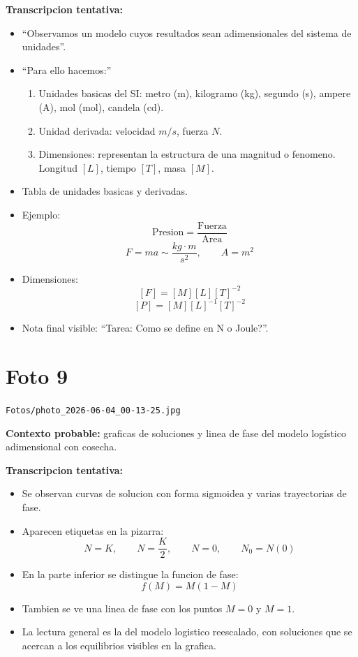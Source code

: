 \documentclass[11pt,letterpaper]{article}
\begin{document}
\textbf{Transcripcion tentativa:}
\begin{itemize}[leftmargin=*]
    \item ``Observamos un modelo cuyos resultados sean adimensionales del sistema de unidades''.
    \item ``Para ello hacemos:''
    \begin{enumerate}[leftmargin=*]
        \item Unidades basicas del SI: metro (m), kilogramo (kg), segundo (s), ampere (A), mol (mol), candela (cd).
        \item Unidad derivada: velocidad \(m/s\), fuerza \(N\).
        \item Dimensiones: representan la estructura de una magnitud o fenomeno. Longitud \([L]\), tiempo \([T]\), masa \([M]\).
    \end{enumerate}
    \item Tabla de unidades basicas y derivadas.
    \item Ejemplo:
    \[
    \text{Presion}=\frac{\text{Fuerza}}{\text{Area}}
    \]
    \[
    F=ma \sim \frac{kg\cdot m}{s^2}, \qquad A=m^2
    \]
    \item Dimensiones:
    \[
    [F]=[M][L][T]^{-2}
    \]
    \[
    [P]=[M][L]^{-1}[T]^{-2}
    \]
    \item Nota final visible: ``Tarea: Como se define en N o Joule?''.
\end{itemize}

\section*{Foto 9}
\texttt{Fotos/photo\_2026-06-04\_00-13-25.jpg}

\textbf{Contexto probable:} graficas de soluciones y linea de fase del modelo logístico adimensional con cosecha.

\textbf{Transcripcion tentativa:}
\begin{itemize}[leftmargin=*]
    \item Se observan curvas de solucion con forma sigmoidea y varias trayectorias de fase.
    \item Aparecen etiquetas en la pizarra:
    \[
    N=K, \qquad N=\frac{K}{2}, \qquad N=0, \qquad N_0=N(0)
    \]
    \item En la parte inferior se distingue la funcion de fase:
    \[
    f(M)=M(1-M)
    \]
    \item Tambien se ve una linea de fase con los puntos \(M=0\) y \(M=1\).
    \item La lectura general es la del modelo logistico reescalado, con soluciones que se acercan a los equilibrios visibles en la grafica.
\end{itemize}
\end{document}
